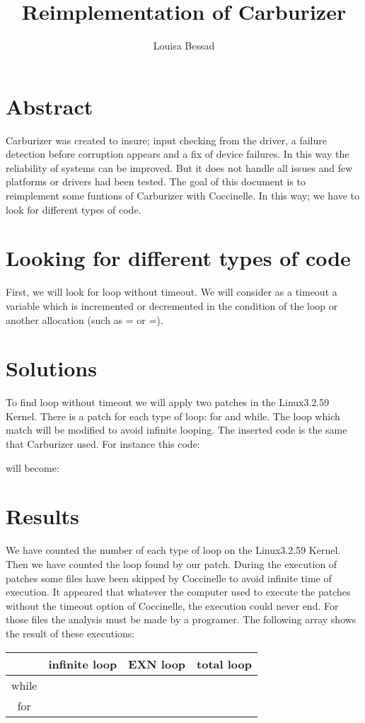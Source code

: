 \documentclass[11pt]{article}
\title{\fontsize{15pt}{10pt}\selectfont\textbf{Reimplementation of Carburizer}}
\author{Louisa Bessad}
\begin{document}
\maketitle

\section{Abstract}
Carburizer was created to insure; input checking from the driver, a failure detection before corruption appears and a fix of device failures. In this way the reliability of systems can be improved. But it does not handle all issues and few platforms or drivers had been tested. The goal of this document is to reimplement some funtions of Carburizer with Coccinelle. In this way; we have to look for different types of code.

\section{Looking for different types of code}
First, we will look for loop without timeout. We will consider as a timeout a variable which is incremented or decremented in the condition of the loop or another allocation (such as  \ll= or \gg=). 

\section{Solutions}
To find loop without timeout we will apply two patches in the Linux3.2.59 Kernel. There is a patch for each type of loop: for and while. The loop which match will be modified to avoid infinite looping. The inserted code is the same that Carburizer used. For instance this code:


will become:



\section{Results}
We have counted the number of each type of loop on the Linux3.2.59 Kernel. Then we have counted the loop found by our patch. During the execution of patches some files have been skipped by Coccinelle to avoid infinite time of execution. It appeared that whatever the computer used to execute the patches without the timeout option of Coccinelle, the execution could never end. For those files the analysis must be made by a programer. The following array shows the result of these executions:

\vspace*{5mm}
\begin{tabular}{|c|c|c|c|}
  \hline
    & infinite loop & EXN loop & total loop \\
  \hline
  while &    &  &  \\
  \hline
  for  &  &  &  \\
  \hline
\end{tabular} 
\vspace*{5mm}
\end{document}
